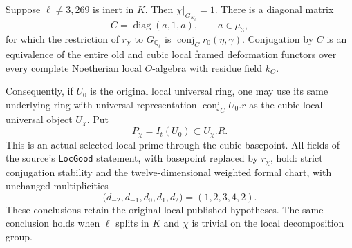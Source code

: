 \begin{proposition}
\label{AC-G49-inert}
Suppose $\ell\ne3,269$ is inert in $K$.
Then $\chi|_{G_{K_\ell}}=1$.  There is a diagonal matrix
\[
             C=\operatorname{diag}(a,1,a),\qquad a\in\mu_3,
                                                                  \tag{G49.3}
\]
for which the restriction of $r_\chi$ to $G_{\mathbb Q_\ell}$
is $\operatorname{conj}_C r_0(\eta,\gamma)$.
Conjugation by $C$ is an equivalence of the entire old and
cubic local framed deformation functors over every complete
Noetherian local $O$-algebra with residue field $k_O$.

Consequently, if $U_0$ is the original local universal ring,
one may use its same underlying ring with universal
representation $\operatorname{conj}_C U_0.r$ as the cubic
local universal object $U_\chi$.  Put
\[
                   P_\chi=I_t(U_0)\subset U_\chi.R.             \tag{G49.4}
\]
This is an actual selected local prime through the cubic
basepoint.  All fields of the source's \texttt{LocGood}
statement, with basepoint replaced by $r_\chi$, hold:
strict conjugation stability and the twelve-dimensional
weighted formal chart, with unchanged multiplicities
\[
 \bigl(d_{-2},d_{-1},d_0,d_1,d_2\bigr)=(1,2,3,4,2).
                                                                  \tag{G49.5}
\]
These conclusions retain the original local published
hypotheses.  The same conclusion holds when $\ell$ splits
in $K$ and $\chi$ is trivial on the local decomposition group.
\end{proposition}
